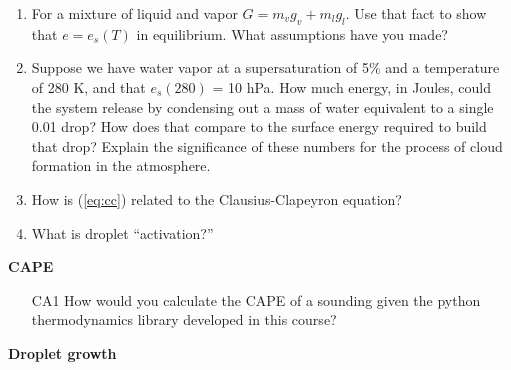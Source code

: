 \documentclass[12pt]{article}
\begin{document}
\begin{enumerate}
\item  For a mixture of liquid and vapor $G=m_v g_v + m_l g_l$.  
Use that fact to
show that $e=e_s(T)$ in equilibrium.  What assumptions have you made?

\item Suppose we have water vapor at a supersaturation of 5\% and a
  temperature of 280 K, and that $e_s(280)$ = 10 hPa.  
How much energy, in Joules, could the system
  release by condensing out a mass of water equivalent to a single
  0.01 \mum drop?  How does that compare to the surface energy
  required to build that drop?  Explain the significance of these
  numbers for the process of cloud formation in the atmosphere.


\item How is  (\ref{eq:cc}) related to the Clausius-Clapeyron equation?


\item What is droplet ``activation?''



\end{enumerate}



\textbf{CAPE}

\begin{enumerate}
\item[CA1]  How would you calculate the CAPE of a sounding given the
python thermodynamics library developed in this course?
\end{enumerate}

\textbf{Droplet growth}
\end{document}
